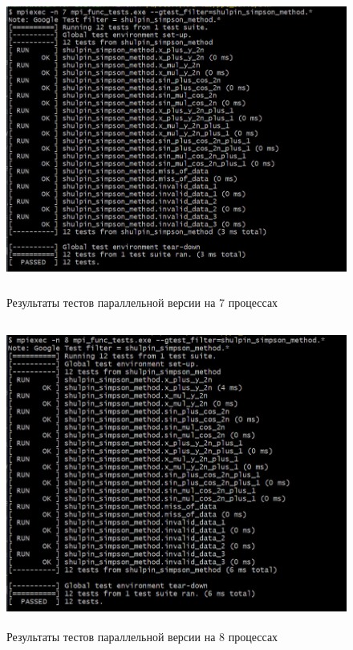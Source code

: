 \documentclass[12pt,a4paper]{article}
\begin{document}
\begin{figure}[H]
\centering
\includegraphics[height=10cm]{img/7nmpitest.jpg}
\caption{\label{fig:visualClass} Результаты тестов параллельной версии на 7 процессах}
\end{figure}

\begin{figure}[H]
\centering
\includegraphics[height=10cm]{img/8nmpitest.jpg}
\caption{\label{fig:visualClass} Результаты тестов параллельной версии на 8 процессах}
\end{figure}
\end{document}
